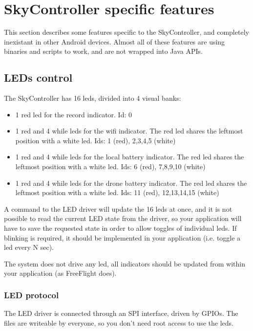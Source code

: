 \section{SkyController specific features}

This section describes some features specific to the SkyController, and completely inexistant in other Android devices. Almost all of these features are using binaries and scripts to work, and are not wrapped into Java APIs.

\subsection{LEDs control}

The SkyController has 16 leds, divided into 4 visual banks:
\begin{itemize}
\item 1 red led for the record indicator. Id: 0
\item 1 red and 4 while leds for the wifi indicator. The red led shares the leftmost position with a white led. Ids: 1 (red), 2,3,4,5 (white)
\item 1 red and 4 while leds for the local battery indicator. The red led shares the leftmost position with a white led. Ids: 6 (red), 7,8,9,10 (white)
\item 1 red and 4 while leds for the drone battery indicator. The red led shares the leftmost position with a white led. Ids: 11 (red), 12,13,14,15 (white)
\end{itemize}

A command to the LED driver will update the 16 leds at once, and it is not possible to read the current LED state from the driver, so your application will have to save the requested state in order to allow toggles of individual leds. If blinking is required, it should be implemented in your application (i.e. toggle a led every N sec).

The system does not drive any led, all indicators should be updated from within your application (as FreeFlight does).

\newpage
\subsubsection{LED protocol}

The LED driver is connected through an SPI interface, driven by GPIOs. The  files are writeable by everyone, so you don't need root access to use the leds.

